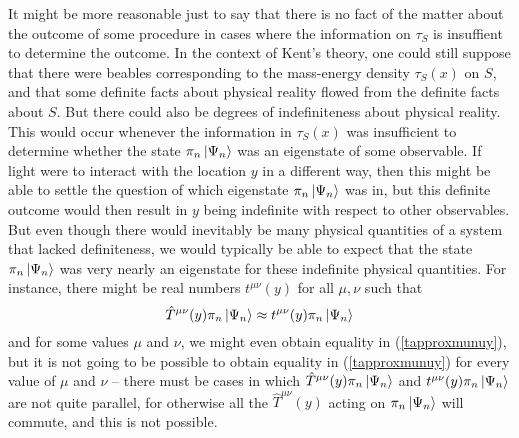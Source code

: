 It might be more reasonable just to say that there is no fact of the matter about the outcome of some procedure in cases where the information on $\tau_S$ is insuffient to determine the outcome.  In the context of Kent's theory, one could still suppose that there were beables corresponding to the mass-energy density $\tau_S(x)$ on $S$, and that some definite facts about physical reality flowed from the definite facts about $S$. But there could also be degrees of indefiniteness about physical reality. This would occur whenever the information in $\tau_S(x)$ was insufficient to determine whether the state $\pi_n\ket{\Psi_n}$ was an eigenstate of some observable. If light were to interact with the location $y$ in a different way, then this might be able to settle the question of which eigenstate $\pi_n\ket{\Psi_n}$ was in, but this definite outcome would then result in $y$ being indefinite with respect to other observables. But even though there would inevitably be many physical quantities of a system that lacked definiteness, we would typically be able to expect that the state $\pi_n\ket{\Psi_n}$ was very nearly an eigenstate for these indefinite physical quantities. For instance, there might be real numbers $t^{\mu\nu}(y)$ for all $\mu, \nu$ such that 
\begin{equation}\label{tapproxmunuy}
\hat{T}^{\mu\nu}(y)\pi_n\ket{\Psi_n}\approx t^{\mu\nu}(y)\pi_n\ket{\Psi_n}
\end{equation}
and for some values $\mu$ and $\nu$, we might even obtain equality in (\ref{tapproxmunuy}), but it is not going to be possible to obtain equality in (\ref{tapproxmunuy}) for every value of $\mu$ and $\nu$ -- there must be cases in which $\hat{T}^{\mu\nu}(y)\pi_n\ket{\Psi_n}$ and $t^{\mu\nu}(y)\pi_n\ket{\Psi_n}$ are not quite parallel, for otherwise all the $\hat{T}^{\mu\nu}(y)$  acting on $\pi_n\ket{\Psi_n}$ will commute, and this is not possible. 

\nocite{Shimony93}
\nocite{Bell}